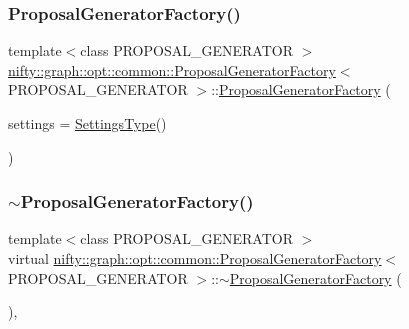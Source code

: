 \subsubsection{\texorpdfstring{Proposal\+Generator\+Factory()}{ProposalGeneratorFactory()}}
{\footnotesize\ttfamily template$<$class P\+R\+O\+P\+O\+S\+A\+L\+\_\+\+G\+E\+N\+E\+R\+A\+T\+OR $>$ \\
\hyperlink{classnifty_1_1graph_1_1opt_1_1common_1_1ProposalGeneratorFactory}{nifty\+::graph\+::opt\+::common\+::\+Proposal\+Generator\+Factory}$<$ P\+R\+O\+P\+O\+S\+A\+L\+\_\+\+G\+E\+N\+E\+R\+A\+T\+OR $>$\+::\hyperlink{classnifty_1_1graph_1_1opt_1_1common_1_1ProposalGeneratorFactory}{Proposal\+Generator\+Factory} (\begin{DoxyParamCaption}\item[{const \hyperlink{classnifty_1_1graph_1_1opt_1_1common_1_1ProposalGeneratorFactory_aab267e2f7f0e242161b4b5fec55f31d9}{Settings\+Type} \&}]{settings = {\ttfamily \hyperlink{classnifty_1_1graph_1_1opt_1_1common_1_1ProposalGeneratorFactory_aab267e2f7f0e242161b4b5fec55f31d9}{Settings\+Type}()} }\end{DoxyParamCaption})\hspace{0.3cm}{\ttfamily [inline]}}

\mbox{\label{classnifty_1_1graph_1_1opt_1_1common_1_1ProposalGeneratorFactory_a3a4521ef20e2b0b11e7cfe39e112c4d7}} 
\subsubsection{\texorpdfstring{$\sim$\+Proposal\+Generator\+Factory()}{~ProposalGeneratorFactory()}}
{\footnotesize\ttfamily template$<$class P\+R\+O\+P\+O\+S\+A\+L\+\_\+\+G\+E\+N\+E\+R\+A\+T\+OR $>$ \\
virtual \hyperlink{classnifty_1_1graph_1_1opt_1_1common_1_1ProposalGeneratorFactory}{nifty\+::graph\+::opt\+::common\+::\+Proposal\+Generator\+Factory}$<$ P\+R\+O\+P\+O\+S\+A\+L\+\_\+\+G\+E\+N\+E\+R\+A\+T\+OR $>$\+::$\sim$\hyperlink{classnifty_1_1graph_1_1opt_1_1common_1_1ProposalGeneratorFactory}{Proposal\+Generator\+Factory} (\begin{DoxyParamCaption}{ }\end{DoxyParamCaption})\hspace{0.3cm}{\ttfamily [inline]}, {\ttfamily [virtual]}}



